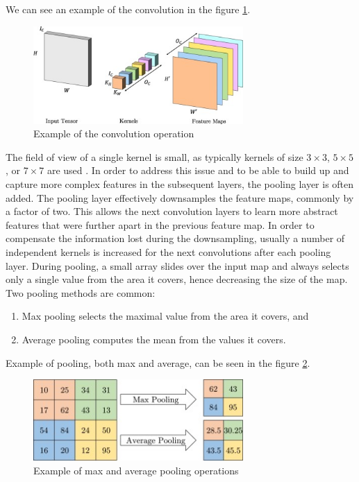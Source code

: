 We can see an example of the convolution in the figure \ref{fig:convolution}.

\begin{figure}[H]
\begin{centering}
\includegraphics[width=8cm]{assets/images/conv.jpg}
\par\end{centering}
\caption{Example of the convolution operation \cite{Santosh2022-2}}
\label{fig:convolution}
\end{figure}

The field of view of a single kernel is small, as typically kernels of size $3\times3$, $5\times5$, or $7\times7$ are used \cite{Santosh2022-2}. In order to address this issue and to be able to build up and capture more complex features in the subsequent layers, the pooling layer is often added. The pooling layer effectively downsamples the feature maps, commonly by a factor of two. This allows the next convolution layers to learn more abstract features that were further apart in the previous feature map. In order to compensate the information lost during the downsampling, usually a number of independent kernels is increased for the next convolutions after each pooling layer. During pooling, a small array slides over the input map and always selects only a single value from the area it covers, hence decreasing the size of the map. Two pooling methods are common:

\begin{enumerate}
    \item Max pooling selects the maximal value from the area it covers, and
    \item Average pooling computes the mean from the values it covers.
\end{enumerate}

Example of pooling, both max and average, can be seen in the figure \ref{fig:pooling}.

\begin{figure}[H]
\begin{centering}
\includegraphics[width=8cm]{assets/images/pooling.jpg}
\par\end{centering}
\caption{Example of max and average pooling operations \cite{Santosh2022-2}}
\label{fig:pooling}
\end{figure}

